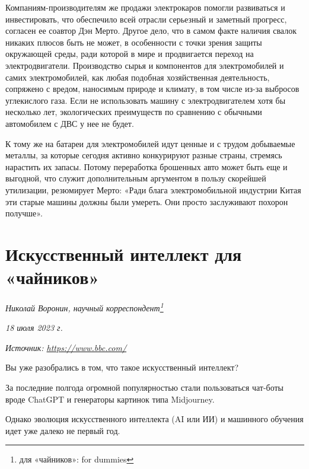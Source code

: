 Компаниям-производителям же продажи электрокаров помогли развиваться и инвестировать, что обеспечило всей отрасли серьезный и заметный прогресс, согласен ее соавтор Дэн Мерто. Другое дело, что в самом факте наличия свалок никаких плюсов быть не может, в особенности с точки зрения защиты окружающей среды, ради которой в мире и продвигается переход на электродвигатели. Производство сырья и компонентов для электромобилей и самих электромобилей, как любая подобная хозяйственная деятельность, сопряжено с вредом, наносимым природе и климату, в том числе из-за выбросов углекислого газа. Если не использовать машину с электродвигателем хотя бы несколько лет, экологических преимуществ по сравнению с обычными автомобилем с ДВС у нее не будет.

К тому же на батареи для электромобилей идут ценные и с трудом добываемые металлы, за которые сегодня активно конкурируют разные страны, стремясь нарастить их запасы. Потому переработка брошенных авто может быть еще и выгодной, что служит дополнительным аргументом в пользу скорейшей утилизации, резюмирует Мерто: «Ради блага электромобильной индустрии Китая эти старые машины должны были умереть. Они просто заслуживают похорон получше».


\newpage


\section{Искусственный интеллект для «чайников»}

\textit{Николай Воронин, научный корреспондент\footnote{для «чайников»: for dummies}}

\textit{18 июля 2023 г.}

\textit{Источник: \url{https://www.bbc.com/}}




Вы уже разобрались в том, что такое искусственный интеллект?

За последние полгода огромной популярностью стали пользоваться чат-боты вроде ChatGPT и генераторы картинок типа Midjourney.

Однако эволюция искусственного интеллекта (AI или ИИ) и машинного обучения идет уже далеко не первый год.

